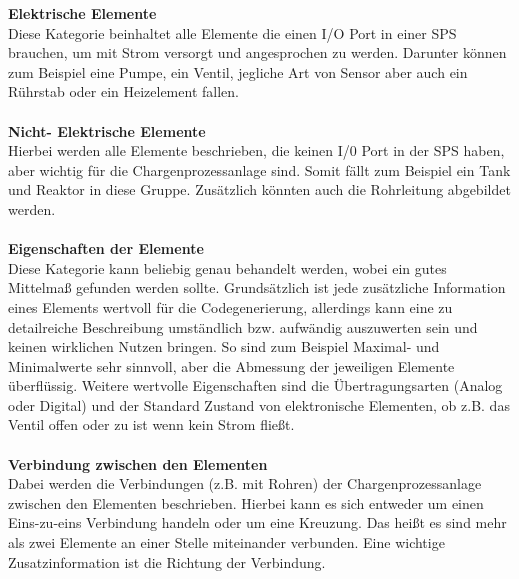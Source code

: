 \textbf{Elektrische Elemente}\\
Diese Kategorie beinhaltet alle Elemente die einen I/O Port in einer SPS brauchen, um mit Strom versorgt und angesprochen zu werden. Darunter können zum Beispiel eine Pumpe, ein Ventil, jegliche Art von Sensor aber auch ein Rührstab oder ein Heizelement fallen. \\\\
\textbf{Nicht- Elektrische Elemente}\\
Hierbei werden alle Elemente beschrieben, die keinen I/0 Port in der SPS haben, aber wichtig für die Chargenprozessanlage sind. Somit fällt zum Beispiel ein Tank und Reaktor in diese Gruppe. Zusätzlich könnten auch die Rohrleitung abgebildet werden.\\\\
\textbf{Eigenschaften der Elemente}  \\
Diese Kategorie kann beliebig genau behandelt werden, wobei ein gutes Mittelmaß gefunden werden sollte. Grundsätzlich ist jede zusätzliche Information eines Elements wertvoll für die Codegenerierung, allerdings kann eine zu detailreiche Beschreibung umständlich bzw. aufwändig auszuwerten sein und keinen wirklichen Nutzen bringen.
So sind zum Beispiel Maximal- und Minimalwerte sehr sinnvoll, aber die Abmessung der jeweiligen Elemente überflüssig. Weitere wertvolle Eigenschaften sind die Übertragungsarten (Analog oder Digital) und der Standard Zustand von elektronische Elementen, ob z.B. das Ventil offen oder zu ist wenn kein Strom fließt.   \\\\
\textbf{Verbindung zwischen den Elementen}  \\
Dabei werden die Verbindungen (z.B. mit Rohren) der Chargenprozessanlage zwischen den Elementen beschrieben. 
Hierbei kann es sich entweder um einen Eins-zu-eins Verbindung handeln oder um eine Kreuzung. Das heißt es sind mehr als zwei Elemente an einer Stelle miteinander verbunden. Eine wichtige Zusatzinformation ist die Richtung der Verbindung.


